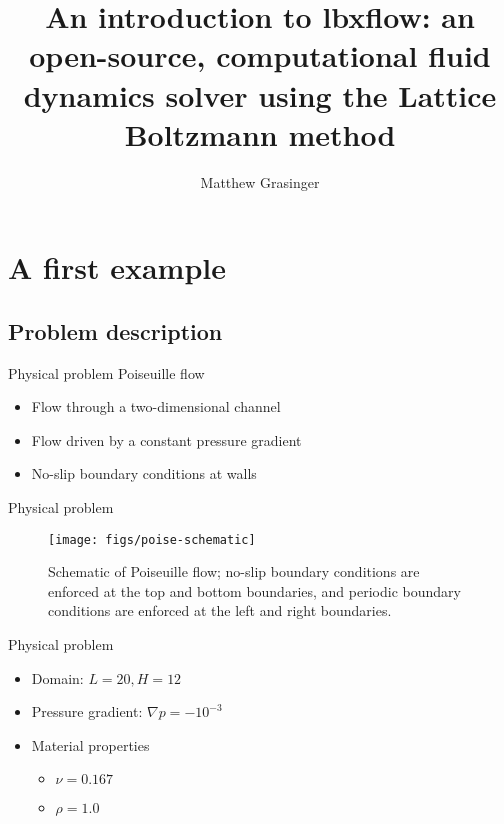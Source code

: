 \documentclass[pdf]{beamer}
\title{An introduction to lbxflow: an open-source, computational fluid dynamics solver using the Lattice Boltzmann method}
\author{Matthew Grasinger}
\begin{document}
\begin{frame}
\titlepage
\end{frame}

\section{A first example}

\subsection{Problem description}

\begin{frame}{Physical problem}
  Poiseuille flow
  \begin{itemize}
    \item Flow through a two-dimensional channel
    \item Flow driven by a constant pressure gradient
    \item No-slip boundary conditions at walls
  \end{itemize}
\end{frame}

\begin{frame}{Physical problem}
  \begin{figure} \label{fig:poise-schematic}
    \texttt{[image: figs/poise-schematic]}
    \caption{Schematic of Poiseuille flow; no-slip boundary conditions are enforced at the top and bottom boundaries, and periodic boundary conditions are enforced at the left and right boundaries.}
  \end{figure}
\end{frame}

\begin{frame}{Physical problem}
  \begin{itemize}
    \item Domain: $L = 20, H = 12$
    \pause
    \item Pressure gradient: $\nabla p = -10^{-3}$
    \pause
    \item Material properties 
      \begin{itemize}
        \item $\nu = 0.167$
        \item $\rho = 1.0$
      \end{itemize}
  \end{itemize}
\end{frame}
\end{document}
